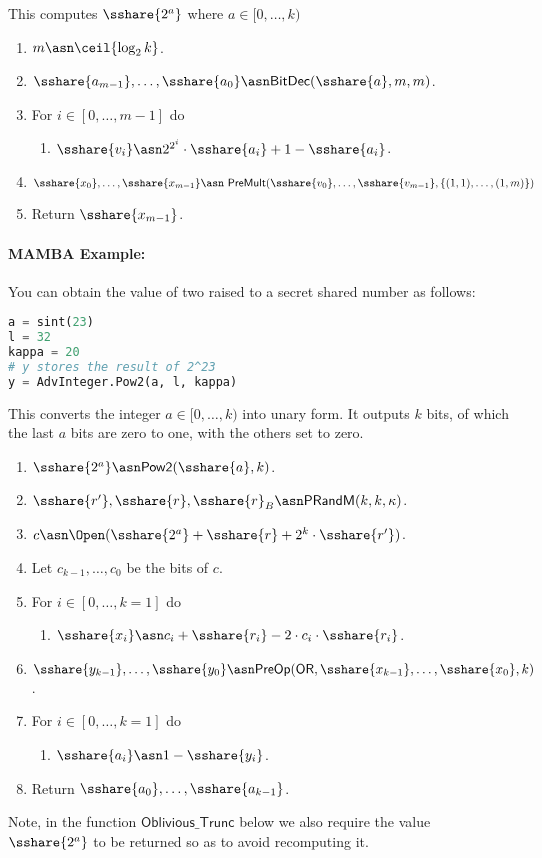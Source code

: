 This computes $\sshare{2^a}$ where $a \in [0,\ldots,k)$
\begin{enumerate}
\item $m \asn \ceil{\log_2 k}$.
\item $\sshare{a_{m-1}},\ldots,\sshare{a_0} \asn \mathsf{BitDec}(\sshare{a},m,m)$.
\item For $i\in [0,\ldots,m-1]$ do
\begin{enumerate}
  \item $\sshare{v_i} \asn 2^{2^i} \cdot \sshare{a_i}+1-\sshare{a_i}$.
\end{enumerate}
\item $\sshare{x_0},\ldots,\sshare{x_{m-1}}
        \asn \ \mathsf{PreMult}(\sshare{v_0},\ldots,\sshare{v_{m-1}}, \{(1,1),\ldots,(1,m)\})$
\item Return $\sshare{x_{m-1}}$.
\end{enumerate}
\paragraph{MAMBA Example:} You can obtain the value of two raised to a secret shared number as follows:
\begin{lstlisting}[language={python}]
a = sint(23)
l = 32
kappa = 20
# y stores the result of 2^23
y = AdvInteger.Pow2(a, l, kappa)
\end{lstlisting}

This converts the integer $a \in [0,\ldots,k)$ into unary form.
It outputs $k$ bits, of which the last $a$ bits are zero to one,
with the others set to zero.
\begin{enumerate}
\item $\sshare{2^a} \asn \mathsf{Pow2}(\sshare{a},k)$.
\item $\sshare{r'}, \sshare{r}, \sshare{r}_B \asn \mathsf{PRandM}(k,k,\kappa)$.
\item $c \asn \Open(\sshare{2^a}+\sshare{r}+2^k \cdot \sshare{r'})$.
\item Let $c_{k-1},\ldots,c_0$ be the bits of $c$.
\item For $i \in [0,\ldots,k=1]$ do
\begin{enumerate}
        \item $\sshare{x_i} \asn c_i+\sshare{r_i}-2 \cdot c_i \cdot \sshare{r_i}$.
\end{enumerate}
\item $\sshare{y_{k-1}},\ldots,\sshare{y_0} \asn \mathsf{PreOp}(\mathsf{OR},\sshare{x_{k-1}},\ldots,\sshare{x_0},k)$.
\item For $i \in [0,\ldots,k=1]$ do
\begin{enumerate}
        \item $\sshare{a_i} \asn 1-\sshare{y_i}$.
\end{enumerate}
\item Return $\sshare{a_0},\ldots,\sshare{a_{k-1}}$.
\end{enumerate}
Note, in the function $\mathsf{Oblivious\_Trunc}$ below we also require the
value $\sshare{2^a}$ to be returned so as to avoid recomputing it.

